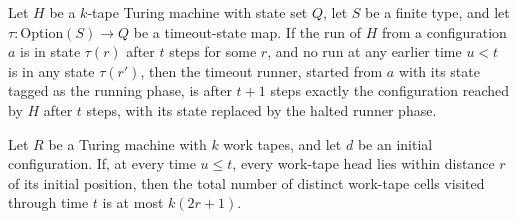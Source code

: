 \begin{theorem}
\label{Turing.wr_timeout_dispatch}
\leanok
{}
Let $H$ be a $k$-tape Turing machine with state set $Q$, let $S$ be a finite type, and
let $\tau : \mathrm{Option}(S) \to Q$ be a timeout-state map. If the run of $H$ from a
configuration $a$ is in state $\tau(r)$ after $t$ steps for some $r$, and no run at any
earlier time $u<t$ is in any state $\tau(r')$, then the timeout runner, started from $a$
with its state tagged as the running phase, is after $t+1$ steps exactly the
configuration reached by $H$ after $t$ steps, with its state replaced by the halted
runner phase.
\end{theorem}

\begin{theorem}
\label{Turing.wr_space}
\leanok
{}
Let $R$ be a Turing machine with $k$ work tapes, and let $d$ be an initial
configuration. If, at every time $u\le t$, every work-tape head lies within distance $r$
of its initial position, then the total number of distinct work-tape cells visited
through time $t$ is at most $k(2r+1)$.
\end{theorem}

